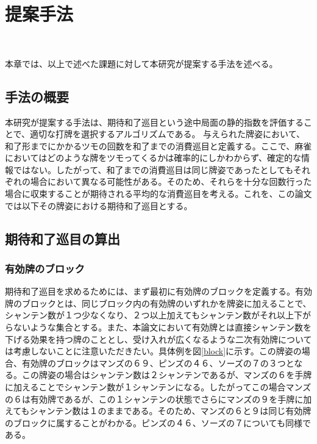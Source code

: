 \chapter{提案手法}　%
\label{chap:approach}

本章では、以上で述べた課題に対して本研究が提案する手法を述べる。

\section{手法の概要}
本研究が提案する手法は、期待和了巡目という途中局面の静的指数を評価することで、適切な打牌を選択するアルゴリズムである。
与えられた牌姿において、和了形までにかかるツモの回数を和了までの消費巡目と定義する。ここで、麻雀においてはどのような牌をツモってくるかは確率的にしかわからず、確定的な情報ではない。したがって、和了までの消費巡目は同じ牌姿であったとしてもそれぞれの場合において異なる可能性がある。そのため、それらを十分な回数行った場合に収束することが期待される平均的な消費巡目を考える。これを、この論文では以下その牌姿における期待和了巡目とする。


\section{期待和了巡目の算出}

\subsection{有効牌のブロック}

期待和了巡目を求めるためには、まず最初に有効牌のブロックを定義する。有効牌のブロックとは、同じブロック内の有効牌のいずれかを牌姿に加えることで、シャンテン数が１つ少なくなり、２つ以上加えてもシャンテン数がそれ以上下がらないような集合とする。また、本論文において有効牌とは直接シャンテン数を下げる効果を持つ牌のこととし、受け入れが広くなるような二次有効牌については考慮しないことに注意いただきたい。具体例を図\ref{block}に示す。この牌姿の場合、有効牌のブロックはマンズの６９、ピンズの４６、ソーズの７の３つとなる。この牌姿の場合はシャンテン数は２シャンテンであるが、マンズの６を手牌に加えることでシャンテン数が１シャンテンになる。したがってこの場合マンズの６は有効牌であるが、この１シャンテンの状態でさらにマンズの９を手牌に加えてもシャンテン数は１のままである。そのため、マンズの６と９は同じ有効牌のブロックに属することがわかる。ピンズの４６、ソーズの７についても同様である。

